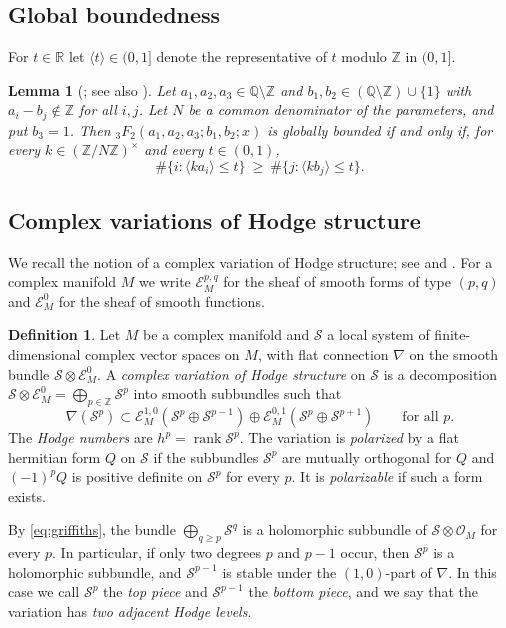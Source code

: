 \documentclass[11pt]{amsart}
\newtheorem{lemma}[theorem]{Lemma}
\theoremstyle{definition}
\newtheorem{definition}[theorem]{Definition}
\theoremstyle{remark}
\numberwithin{equation}{section}
\newcommand{\Q}{\mathbb{Q}}
\newcommand{\Z}{\mathbb{Z}}
\newcommand{\R}{\mathbb{R}}
\newcommand{\cS}{\mathcal{S}}
\newcommand{\cO}{\mathcal{O}}
\newcommand{\cE}{\mathcal{E}}
\DeclareMathOperator{\rank}{rank}
\begin{document}
\subsection{Global boundedness}
For $t\in\R$ let $\langle t\rangle\in(0,1]$ denote the representative of $t$ modulo $\Z$ in $(0,1]$.

\begin{lemma}[{\citet[Propositions~1 and~1bis]{Christol1987}; see also \citet{FurnsinnYurkevich2024}}]\label{lem:christol}
Let $a_1,a_2,a_3\in\Q\setminus\Z$ and $b_1,b_2\in(\Q\setminus\Z)\cup\{1\}$ with $a_i-b_j\notin\Z$ for all $i,j$. Let $N$ be a common denominator of the parameters, and put $b_3=1$. Then ${}_3F_2(a_1,a_2,a_3;b_1,b_2;x)$ is globally bounded if and only if, for every $k\in(\Z/N\Z)^\times$ and every $t\in(0,1)$,
\[
\#\{i:\langle ka_i\rangle\le t\}\ \ge\ \#\{j:\langle kb_j\rangle\le t\}.
\]
\end{lemma}

\subsection{Complex variations of Hodge structure}
We recall the notion of a complex variation of Hodge structure; see \citet[\S1]{Deligne1987} and \citet{Simpson1988}. For a complex manifold $M$ we write $\cE^{p,q}_M$ for the sheaf of smooth forms of type $(p,q)$ and $\cE^0_M$ for the sheaf of smooth functions.

\begin{definition}\label{def:cvhs}
Let $M$ be a complex manifold and $\cS$ a local system of finite-dimensional complex vector spaces on $M$, with flat connection $\nabla$ on the smooth bundle $\cS\otimes\cE^0_M$. A \emph{complex variation of Hodge structure} on $\cS$ is a decomposition $\cS\otimes\cE^0_M=\bigoplus_{p\in\Z}\cS^p$ into smooth subbundles such that
\begin{equation}\label{eq:griffiths}
\nabla(\cS^p)\subset\cE^{1,0}_M(\cS^p\oplus\cS^{p-1})\oplus\cE^{0,1}_M(\cS^p\oplus\cS^{p+1})\qquad\text{for all }p .
\end{equation}
The \emph{Hodge numbers} are $h^p=\rank\cS^p$. The variation is \emph{polarized} by a flat hermitian form $Q$ on $\cS$ if the subbundles $\cS^p$ are mutually orthogonal for $Q$ and $(-1)^pQ$ is positive definite on $\cS^p$ for every $p$. It is \emph{polarizable} if such a form exists.
\end{definition}

By \eqref{eq:griffiths}, the bundle $\bigoplus_{q\ge p}\cS^q$ is a holomorphic subbundle of $\cS\otimes\cO_M$ for every $p$. In particular, if only two degrees $p$ and $p-1$ occur, then $\cS^p$ is a holomorphic subbundle, and $\cS^{p-1}$ is stable under the $(1,0)$-part of $\nabla$. In this case we call $\cS^p$ the \emph{top piece} and $\cS^{p-1}$ the \emph{bottom piece}, and we say that the variation has \emph{two adjacent Hodge levels}.
\end{document}
